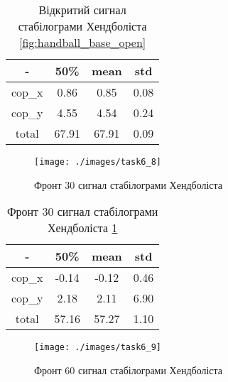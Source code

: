 \begin{table}[!ht]
    \centering
    \caption{Відкритий сигнал стабілограми Хендболіста \ref{fig:handball_base_open}}
    \label{tab:handball_base_open}

    \begin{tabular}{|c|c|c|c|}
        \toprule
        -      & 50\%  & mean  & std  \\

        \midrule
        cop\_x & 0.86  & 0.85  & 0.08 \\
        \hline
        cop\_y & 4.55  & 4.54  & 0.24 \\

        \bottomrule
        total  & 67.91 & 67.91 & 0.09 \\
        \hline
    \end{tabular}
\end{table}

\begin{figure}[!ht]
    \centering
    \texttt{[image: ./images/task6\_8]}
    \caption{Фронт 30 сигнал стабілограми Хендболіста}
    \label{fig:handball_sway_front30}
\end{figure}

\begin{table}[!ht]
    \centering
    \caption{Фронт 30 сигнал стабілограми Хендболіста \ref{fig:handball_sway_front30}}
    \label{tab:handball_sway_front30}

    \begin{tabular}{|c|c|c|c|}
        \toprule
        -      & 50\%  & mean  & std  \\

        \midrule
        cop\_x & -0.14 & -0.12 & 0.46 \\
        \hline
        cop\_y & 2.18  & 2.11  & 6.90 \\

        \bottomrule
        total  & 57.16 & 57.27 & 1.10 \\
        \hline
    \end{tabular}
\end{table}

\begin{figure}[!ht]
    \centering
    \texttt{[image: ./images/task6\_9]}
    \caption{Фронт 60 сигнал стабілограми Хендболіста}
    \label{fig:handball_sway_front60}
\end{figure}

